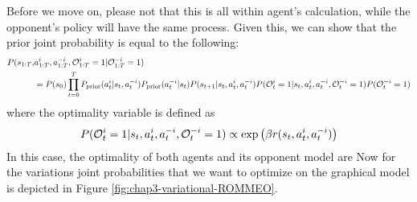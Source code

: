 Before we move on, please not that this is all within agent's calculation, while the opponent's policy will have the same process. Given this, we can show that the prior joint probability is equal to the following:
\begin{equation}
    \begin{aligned}
        P(s_{1:T}, &a^i_{1:T}, a^{-i}_{1:T}, \mathcal{O}^i_{1:T} = 1 | \mathcal{O}^{-i}_{1:T} = 1) \\
        &= P(s_0) \prod^T_{t=0} P_{\text{prior}}(a^i_t | s_t, a^{-i}_t) P_{\text{prior}}(a^{-i}_t | s_t) P(s_{t+1} | s_t, a^i_t, a^{-i}_t) P(\mathcal{O}^i_t = 1 | s_t, a^i_t, a^{-i}_t, \mathcal{O}^{-i}_t = 1) P(\mathcal{O}^{-i}_t = 1)
    \end{aligned}
\end{equation}
where the optimality variable is defined as 
\begin{equation}
    P(\mathcal{O}_t^i = 1 | s_t, a^i_t, a^{-i}_t, \mathcal{O}^{-i}_t = 1) \propto \exp \left(  \beta r(s_t, a^i_t, a^{-i}_t)   \right)
\end{equation}
In this case, the optimality of both agents and its opponent model are 
Now for the variations joint probabilities that we want to optimize on the graphical model is depicted in Figure \ref{fig:chap3-variational-ROMMEO}.
